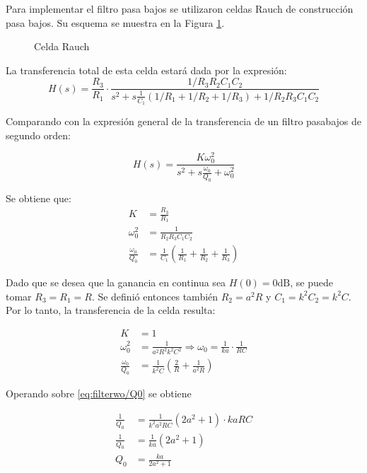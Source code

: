 Para implementar el filtro pasa bajos se utilizaron celdas Rauch de construcción pasa bajos. Su esquema se muestra en la Figura \ref{fig:Rauch-Cell}.

\begin{figure}[ht]
    \centering
    
    \caption{Celda Rauch}
    \label{fig:Rauch-Cell}
\end{figure}

La transferencia total de esta celda estará dada por la expresión:
\begin{equation}
    H(s)=\frac{R_3}{R_1}\cdot\frac{1/R_3 R_2 C_1 C_2}{s^2+s \frac{1}{C_1}(1/R_1+1/R_2+1/R_3)+1/R_2 R_3 C_1 C_2}
\end{equation}

Comparando con la expresión general de la transferencia de un filtro pasabajos de segundo orden:

\begin{equation*}
    H(s)=\frac{K \omega_0^2}{s^2 +s\frac{\omega_0}{Q_0}+\omega_0 ^2}
\end{equation*}

Se obtiene que:
\begin{align}
    K   &=  \frac{R_3}{R_1}\\
    \omega_0^2  &=  \frac{1}{R_2 R_3 C_1 C_2}\\
    \frac{\omega_0}{Q_0}    &=  \frac{1}{C_1}\left(\frac{1}{R_1}+\frac{1}{R_2}+\frac{1}{R_3}\right)
\end{align}

Dado que se desea que la ganancia en continua sea $H(0)=0\si{\deci\bel}$, se puede tomar $R_3 = R_1 = R$. Se definió entonces también $R_2=a^2R$ y $C_1 = k^2 C_2 = k^2 C$. Por lo tanto, la transferencia de la celda resulta:

\begin{align}
    K&=1\\
    \omega_0^2&=\frac{1}{a^2 R^2 k^2 C^2} \Rightarrow \omega_0 =\frac{1}{ka}\cdot\frac{1}{R C}\\
    \frac{\omega_0}{Q_0} &= \frac{1}{k^2 C} \left(\frac{2}{R}+\frac{1}{a^2 R}\right) \label{eq:filterwo/Q0}
\end{align}

Operando sobre \eqref{eq:filterwo/Q0} se obtiene

\begin{align*}
    \frac{1}{Q_0} &= \frac{1}{k^2 a^2 RC}\left(2 a^2 + 1 \right)\cdot kaRC\\
    \frac{1}{Q_0} &= \frac{1}{ka} \left(2a^2+1\right)\\
    Q_0 &= \frac{ka}{2a^2+1}
\end{align*}

